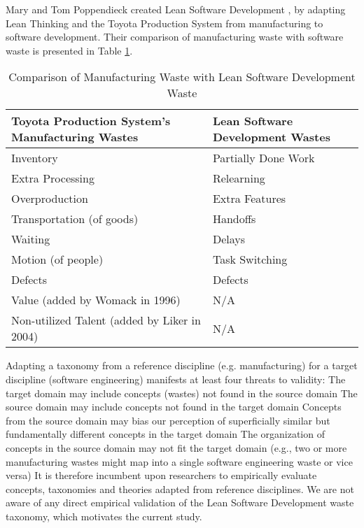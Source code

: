 Mary and Tom Poppendieck  created Lean Software Development \cite{PoppendieckLeanSoftwareDevelopment}, by adapting Lean Thinking and the Toyota Production System from manufacturing to software development. Their comparison of manufacturing waste with software waste is presented in Table \ref{ManufacturingVersusLeanSoftwareWaste}.

\begin{table}[t]
\renewcommand{\arraystretch}{1.5}
\centering
\caption{Comparison of Manufacturing Waste with Lean Software Development Waste}
\label{ManufacturingVersusLeanSoftwareWaste}
\begin{tabular}{|p{1.57in}|p{1.57in}|}
\hline
Toyota Production System's Manufacturing Wastes & Lean Software Development Wastes \\ \hline
Inventory                                       & Partially Done Work                       \\ \hline
Extra Processing                                & Relearning                                \\ \hline
Overproduction                                  & Extra Features                            \\ \hline
Transportation (of goods)                       & Handoffs                                  \\ \hline
Waiting                                         & Delays                                    \\ \hline
Motion (of people)                              & Task Switching                            \\ \hline
Defects                                         & Defects                                   \\ \hline
Value (added by Womack in 1996)                 & N/A                                       \\ \hline
Non-utilized Talent (added by Liker in 2004)     & N/A                                       \\ \hline
\end{tabular}
\end{table}

Adapting a taxonomy from a reference discipline (e.g. manufacturing) for a target discipline (software engineering) manifests at least four threats to validity: 
The target domain may include concepts (wastes) not found in the source domain 
The source domain may include concepts not found in the target domain
Concepts from the source domain may bias our perception of superficially similar but fundamentally different concepts in the target domain
The organization of concepts in the source domain may not fit the target domain (e.g., two or more manufacturing wastes might map into a single software engineering waste or vice versa) 
It is therefore incumbent upon researchers to empirically evaluate concepts, taxonomies and theories adapted from reference disciplines. We are not aware of any direct empirical validation of the Lean Software Development waste taxonomy, which motivates the current study. 

